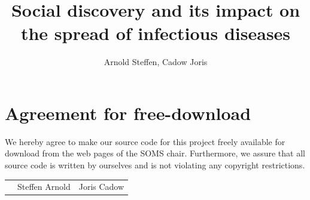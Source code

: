 \documentclass[11pt]{article}
\title{Social discovery and its impact on the spread of infectious diseases}
\author{Arnold Steffen, Cadow Joris}
\begin{document}

\newpage


\newpage
\section*{Agreement for free-download}
\bigskip


\bigskip


\large We hereby agree to make our source code for this project freely available for download from the web pages of the SOMS chair.
Furthermore, we assure that all source code is written by ourselves and is not violating any copyright restrictions.


\begin{center}

\bigskip


\bigskip


\begin{tabular}{@{}p{3.3cm}@{}p{6cm}@{}@{}p{6cm}@{}}
\begin{minipage}{3cm}

\end{minipage}
&
\begin{minipage}{6cm}
\vspace{5mm} \large Steffen Arnold

 \vspace{\baselineskip}

\end{minipage}
&
\begin{minipage}{6cm}

\large Joris Cadow

\end{minipage}
\end{tabular}


\end{center}
\newpage







\tableofcontents
\end{document}
